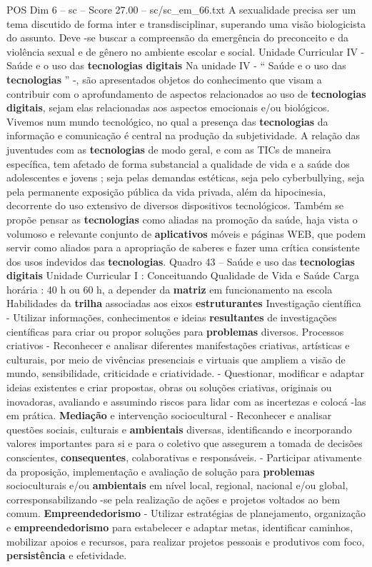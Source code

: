 \begin{textsample}{POS Dim 6 – sc – Score 27.00 – sc/sc\_em\_66.txt}
A sexualidade precisa ser um tema discutido de forma inter e transdisciplinar, superando uma visão biologicista do assunto.
Deve -se buscar a compreensão da emergência do preconceito e da violência sexual e de gênero no ambiente escolar e social.
Unidade Curricular IV - Saúde e o uso das \textbf{tecnologias} \textbf{digitais} Na unidade IV - “ Saúde e o uso das \textbf{tecnologias} ” -, são apresentados objetos do conhecimento que visam a contribuir com o aprofundamento de aspectos relacionados ao uso de \textbf{tecnologias} \textbf{digitais}, sejam elas relacionadas aos aspectos emocionais e/ou biológicos.
Vivemos num mundo tecnológico, no qual a presença das \textbf{tecnologias} da informação e comunicação é central na produção da subjetividade.
A relação das juventudes com as \textbf{tecnologias} de modo geral, e com as TICs de maneira específica, tem afetado de forma substancial a qualidade de vida e a saúde dos adolescentes e jovens ; seja pelas demandas estéticas, seja pelo cyberbullying, seja pela permanente exposição pública da vida privada, além da hipocinesia, decorrente do uso extensivo de diversos dispositivos tecnológicos.
Também se propõe pensar as \textbf{tecnologias} como aliadas na promoção da saúde, haja vista o volumoso e relevante conjunto de \textbf{aplicativos} móveis e páginas WEB, que podem servir como aliados para a apropriação de saberes e fazer uma crítica consistente dos usos indevidos das \textbf{tecnologias}.
Quadro 43 – Saúde e uso das \textbf{tecnologias} \textbf{digitais} Unidade Curricular I : Conceituando Qualidade de Vida e Saúde Carga horária : 40 h ou 60 h, a depender da \textbf{matriz} em funcionamento na escola Habilidades da \textbf{trilha} associadas aos eixos \textbf{estruturantes} Investigação científica - Utilizar informações, conhecimentos e ideias \textbf{resultantes} de investigações científicas para criar ou propor soluções para \textbf{problemas} diversos.
Processos criativos - Reconhecer e analisar diferentes manifestações criativas, artísticas e culturais, por meio de vivências presenciais e virtuais que ampliem a visão de mundo, sensibilidade, criticidade e criatividade. - Questionar, modificar e adaptar ideias existentes e criar propostas, obras ou soluções criativas, originais ou inovadoras, avaliando e assumindo riscos para lidar com as incertezas e colocá -las em prática. \textbf{Mediação} e intervenção sociocultural - Reconhecer e analisar questões sociais, culturais e \textbf{ambientais} diversas, identificando e incorporando valores importantes para si e para o coletivo que assegurem a tomada de decisões conscientes, \textbf{consequentes}, colaborativas e responsáveis. - Participar ativamente da proposição, implementação e avaliação de solução para \textbf{problemas} socioculturais e/ou \textbf{ambientais} em nível local, regional, nacional e/ou global, corresponsabilizando -se pela realização de ações e projetos voltados ao bem comum. \textbf{Empreendedorismo} - Utilizar estratégias de planejamento, organização e \textbf{empreendedorismo} para estabelecer e adaptar metas, identificar caminhos, mobilizar apoios e recursos, para realizar projetos pessoais e produtivos com foco, \textbf{persistência} e efetividade.

\end{textsample}
